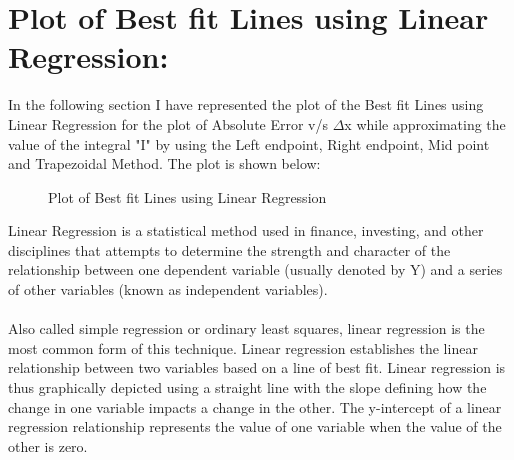 \documentclass[12pt,a4paper]{article}
\begin{document}
\section{Plot of Best fit Lines using Linear Regression:}
In the following section I have represented the plot of the Best fit Lines using Linear Regression for the plot of Absolute Error v/s $\Delta$x while approximating the value of the integral "I" by using the Left endpoint, Right endpoint, Mid point and Trapezoidal Method. The plot is shown below:
\clearpage
\begin{figure}[h]
	\begin{center}
	\end{center}
	\caption{Plot of Best fit Lines using Linear Regression}
\end{figure}
\noindent
Linear Regression is a statistical method used in finance, investing, and other disciplines that attempts to determine the strength and character of the relationship between one dependent variable (usually denoted by Y) and a series of other variables (known as independent variables).\\
\\Also called simple regression or ordinary least squares, linear regression is the most common form of this technique. Linear regression establishes the linear relationship between two variables based on a line of best fit. Linear regression is thus graphically depicted using a straight line with the slope defining how the change in one variable impacts a change in the other. The y-intercept of a linear regression relationship represents the value of one variable when the value of the other is zero. 
\end{document}
